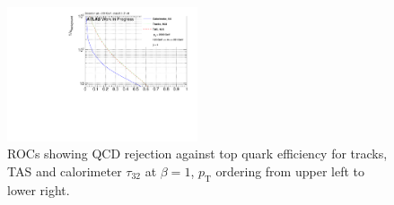 \begin{figure}[htp]
\includegraphics[width=0.5\textwidth]{sascha_input/plots/Top/beta1/ROC_ALL_h_recoJet_nSub32_bin6.pdf}
\caption{\footnotesize{ROCs showing QCD rejection against top quark efficiency for tracks, TAS and calorimeter $\tau_{32}$ at $\beta=1$, $p_{\mathrm{T}}$ ordering from upper left to lower right.}}\label{fig:ROC_top}
\end{figure}



